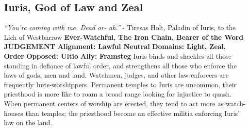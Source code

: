 \subsection{Iuris, God of Law and Zeal}\label{god:iuris}
\textit{“You’re coming with me. Dead or- ah.”}
\break
\hspace*{\fill} - Tiresas Holt, Paladin of Iuris, to the Lich of Westbarrow 
\break
\break
\textbf{Ever-Watchful, The Iron Chain, Bearer of the Word JUDGEMENT}\break
\hspace*{\fill}\break
\textbf{Alignment:\hspace*{\fill} Lawful Neutral} \break
\textbf{Domains:\hspace*{\fill} Light, Zeal, Order} \break
\textbf{Opposed:\hspace*{\fill} Ultio} \break
\textbf{Ally:\hspace*{\fill} Framsteg} \break
\hspace*{\fill}\break
Iuris binds and shackles all those standing in defiance of lawful order, and strengthens all those who enforce the laws of gods, men and land.\newline
Watchmen, judges, and other law-enforcers are frequently Iuris-worshippers.\newline
Permanent temples to Iuris are uncommon, their priesthood is more like to roam a broad range looking for injustice to quash. When permanent centers of worship are erected, they tend to act more as watch-houses than temples; the priesthood become an effective militia enforcing Iuris’ law on the land.

